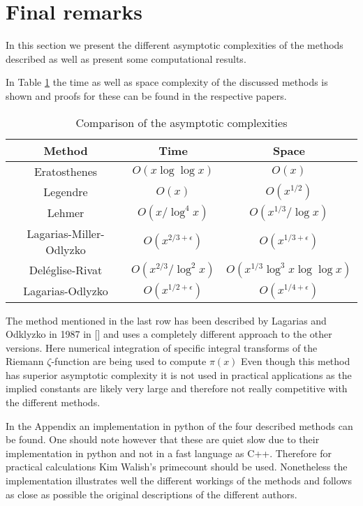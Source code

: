 \newpage
\section{Final remarks}
In this section we present the different asymptotic complexities of the methods described as well as present some computational results.

In Table \ref{tab:runtime} the time as well as space complexity of the discussed methods is shown and proofs for
these can be found in the respective papers.
\begin{table}[htpb]
	\centering
	\label{tab:runtime}
	\begin{tabular}{|c|c|c|}
		\hline
		Method & Time & Space\\ \hline
		Eratosthenes & $O(x \log \log x)$ & $O(x)$ \\
		Legendre &  $O(x)$ &  $O(x^{1 / 2})$ \\
		Lehmer & $O(x / \log^{4} x)$ & $O(x^{1 / 3} / \log x)$\\
		Lagarias-Miller-Odlyzko & $O(x^{2 /3 + \epsilon})$ & $O(x^{1 /3 + \epsilon})$ \\
		Deléglise-Rivat & $O(x^{2 /3} / \log^2 x)$ & $O(x^{1 / 3} \log^3 x \log \log x)$\\
		Lagarias-Odlyzko & $O(x^{1 /2 + \epsilon})$ & $O(x^{1 / 4 + \epsilon})$ \\\hline
	\end{tabular}
	\caption{Comparison of the asymptotic complexities}
\end{table}

The method mentioned in the last row has been described by Lagarias and Odklyzko in 1987 in [] and uses a completely different approach to
the other versions. Here numerical integration of specific integral transforms of the Riemann $\zeta$-function are being used to compute $ \pi(x)$
Even though this method has superior asymptotic complexity it is not used in practical applications as the implied constants are likely very large
and therefore not really competitive with the different methods.

In the Appendix an implementation in python of the four described methods can be found. One should note however
that these are quiet slow due to their implementation in python and not in a fast language as C++.
Therefore for practical calculations Kim Walish's primecount should be used. Nonetheless the implementation
illustrates well the different workings of the methods and follows as close as possible the 
original descriptions of the different authors.

